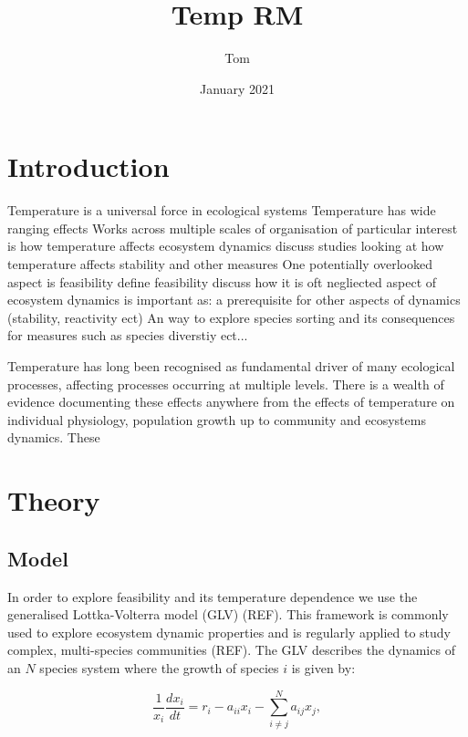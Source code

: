\documentclass{article}
\title{Temp RM}
\author{Tom}
\date{January 2021}
\begin{document}
\maketitle

\section{Introduction}
\begin{outline}
    \1 Temperature is a universal force in ecological systems
        \2 Temperature has wide ranging effects
        \2 Works across multiple scales of organisation
    \1 of particular interest is how temperature affects ecosystem dynamics 
        \2 discuss studies looking at how temperature affects stability and other measures
    \1 One potentially overlooked aspect is feasibility 
        \2 define feasibility
        \2 discuss how it is oft negliected aspect of ecosystem dynamics
        \2 is important as:
            \3 a prerequisite for other aspects of dynamics (stability, reactivity ect) 
            \3 An way to explore species sorting and its consequences for measures such as species diverstiy ect...  
\end{outline}

Temperature has long been recognised as fundamental driver of many ecological processes, affecting processes occurring at multiple levels. There is a wealth of evidence documenting these effects anywhere from the effects of temperature on individual physiology,  population growth up to community and ecosystems dynamics. These 

\section{Theory}
\subsection{Model}
In order to explore feasibility and its temperature dependence we use the generalised Lottka-Volterra model (GLV) (REF). This framework is commonly used to explore ecosystem dynamic properties and is regularly applied to study complex, multi-species communities (REF). The GLV describes the dynamics of an $N$ species system where the growth of species $i$ is given by:

\begin{equation} \label{EQ:GLV}
  \frac{1}{x_i} \frac{dx_i}{dt} = r_i - a_{ii} x_i - \sum^N_{i \neq j} a_{ij} x_j, 
\end{equation}
\end{document}
